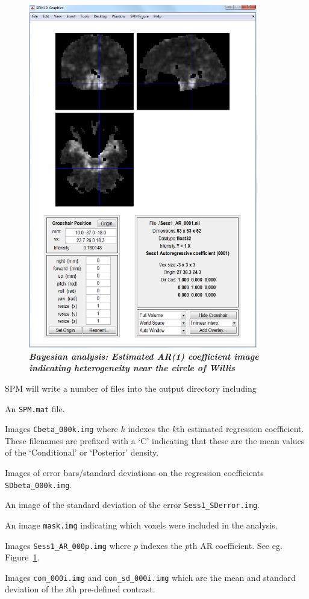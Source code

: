 \begin{figure}
\begin{center}
\includegraphics[width=100mm]{faces/face_ar1}
\caption{\em {\bf Bayesian analysis: Estimated AR(1) coefficient image indicating heterogeneity near the circle of Willis} \label{face_ar1} }
\end{center}
\end{figure}

SPM will write a number of files into the output directory including 

\bi
\item{An \verb!SPM.mat! file.}
\item{Images   \verb!Cbeta_000k.img! where $k$ indexes the $k$th estimated regression coefficient. These filenames are prefixed with a `C' indicating that these are the mean values of the `Conditional' or `Posterior' density.}
\item{Images of error bars/standard deviations on the regression coefficients \verb!SDbeta_000k.img!.}
\item{An image of the standard deviation of the error \verb!Sess1_SDerror.img!.}
\item{An image \verb!mask.img! indicating which voxels were included in the analysis.}
\item{Images \verb!Sess1_AR_000p.img! where $p$ indexes the $p$th AR coefficient. See eg. Figure~\ref{face_ar1}.}
\item{Images \verb!con_000i.img! and \verb!con_sd_000i.img! which are the mean and standard deviation of the $i$th pre-defined contrast.} 
\ei

